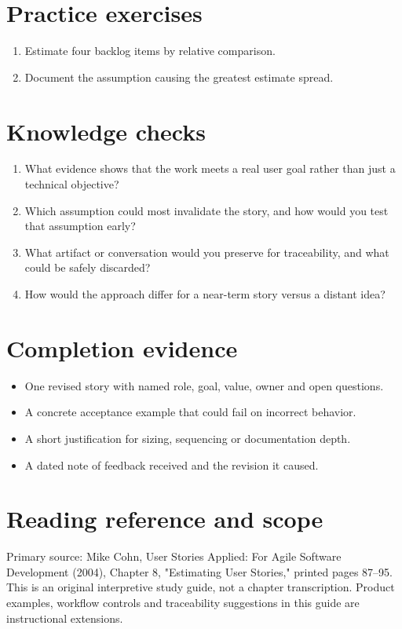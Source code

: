 \documentclass[11pt,letterpaper]{article}
\begin{document}
\section{Practice exercises}
\begin{enumerate}[leftmargin=*,itemsep=3pt]
\item Estimate four backlog items by relative comparison.
\item Document the assumption causing the greatest estimate spread.
\end{enumerate}
\section{Knowledge checks}
\begin{enumerate}[leftmargin=*,itemsep=3pt]
\item What evidence shows that the work meets a real user goal rather than just a technical objective?
\item Which assumption could most invalidate the story, and how would you test that assumption early?
\item What artifact or conversation would you preserve for traceability, and what could be safely discarded?
\item How would the approach differ for a near-term story versus a distant idea?
\end{enumerate}
\section{Completion evidence}
\begin{itemize}[leftmargin=*,itemsep=2pt]
\item One revised story with named role, goal, value, owner and open questions.
\item A concrete acceptance example that could fail on incorrect behavior.
\item A short justification for sizing, sequencing or documentation depth.
\item A dated note of feedback received and the revision it caused.
\end{itemize}
\section{Reading reference and scope}
Primary source: Mike Cohn, User Stories Applied: For Agile Software Development (2004), Chapter 8, "Estimating User Stories," printed pages 87–95. This is an original interpretive study guide, not a chapter transcription. Product examples, workflow controls and traceability suggestions in this guide are instructional extensions.
\end{document}

